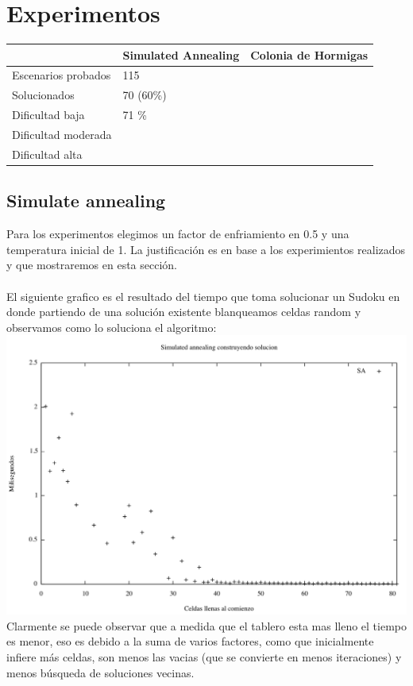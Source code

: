 \section{Experimentos}

\begin{table}
\centering
\begin{tabular}{|l|l|l|}
\hline
          & \textbf{Simulated Annealing} & \textbf{Colonia de Hormigas} \\ \hline
{Escenarios probados} &       115                       &                              \\ \hline
{Solucionados} &                      70 (60\%)      &                              \\ \hline
{Dificultad baja} &                     71 \%         &                              \\ \hline
{Dificultad moderada} &                              &                              \\ \hline
{Dificultad alta} &                              &                              \\ \hline
\end{tabular}
\end{table}

\subsection{Simulate annealing}
Para los experimentos elegimos un factor de enfriamiento en 0.5 y una temperatura inicial de 1. La justificación es en base a los experimientos realizados y que mostraremos en esta sección. \\ \\

El siguiente grafico es el resultado del tiempo que toma solucionar un Sudoku en donde partiendo de una solución existente blanqueamos celdas random y observamos como lo soluciona el algoritmo:
\includegraphics[scale=0.6]{imgs/randomSA.png}	
Clarmente se puede observar que a medida que el tablero esta mas lleno el tiempo es menor, eso es debido a la suma de varios factores, como que inicialmente infiere más celdas, son menos las vacias (que se convierte en menos iteraciones) y menos búsqueda de soluciones vecinas.\\\\

